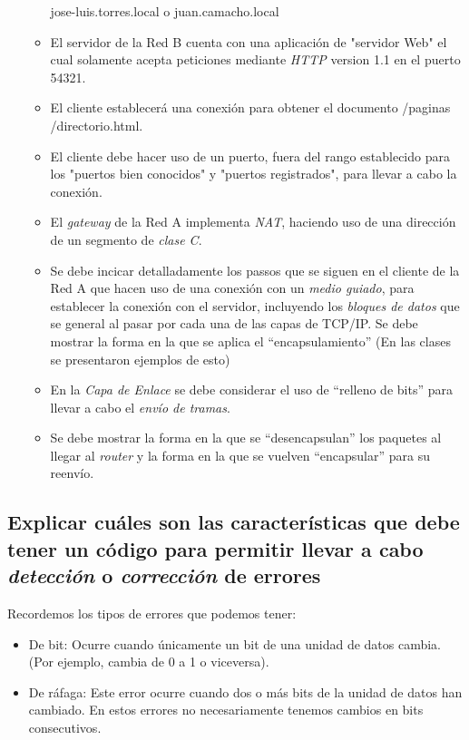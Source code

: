 \documentclass[spanish,12pt,letterpaper]{article}
\begin{document}
\begin{itemize}
\begin{itemize}
    jose-luis.torres.local o juan.camacho.local
  \item El servidor de la Red B cuenta con una aplicación de "servidor Web" el
    cual solamente acepta peticiones mediante \textit{HTTP} version 1.1 en el
    puerto 54321.
  \item El cliente establecerá una conexión para obtener el documento /paginas
    /directorio.html.
  \item El cliente debe hacer uso de un puerto, fuera del rango establecido para
    los "puertos bien conocidos" y "puertos registrados", para llevar a cabo la
    conexión.
  \item El \textit{gateway} de la Red A implementa \textit{NAT}, haciendo uso de
    una dirección de un segmento de \textit{clase C}.
  \item Se debe incicar detalladamente los passos que se siguen en el cliente de
    la Red A que hacen uso de una conexión con un \textit{medio guiado}, para
    establecer la conexión con el servidor, incluyendo los \textit{bloques de
      datos} que se general al pasar por cada una de las capas de TCP/IP. Se debe
    mostrar la forma en la que se aplica el ``encapsulamiento'' (En las clases se
    presentaron ejemplos de esto)
  \item En la \textit{Capa de Enlace} se debe considerar el uso de ``relleno de
    bits'' para llevar a cabo el \textit{envío de tramas}.
  \item Se debe mostrar la forma en la que se ``desencapsulan'' los paquetes al
    llegar al \textit{router} y la forma en la que se vuelven ``encapsular'' para
    su reenvío.
  \end{itemize}
\end{itemize}

\subsection{Explicar cuáles son las características que debe tener un código para
  permitir llevar a cabo \textit{detección} o \textit{corrección} de errores}

Recordemos los tipos de errores que podemos tener:
\begin{itemize}
\item De bit: Ocurre cuando únicamente un bit de una unidad de datos cambia. (Por
  ejemplo, cambia de 0 a 1 o viceversa).
\item De ráfaga: Este error ocurre cuando dos o más bits de la unidad de datos
  han cambiado. En estos errores no necesariamente tenemos cambios en bits
  consecutivos.
\end{itemize}
\end{document}
